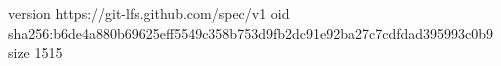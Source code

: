 version https://git-lfs.github.com/spec/v1
oid sha256:b6de4a880b69625eff5549c358b753d9fb2dc91e92ba27c7cdfdad395993c0b9
size 1515
